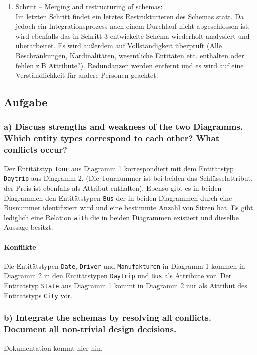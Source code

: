 \documentclass[11pt,a4paper,DIV=9]{scrartcl}
\newcounter{temp}
\newcommand{\aufgabe}[1]{
  \setcounter{temp}{\value{subsection}}
  \setcounter{subsection}{#1}
  \addtocounter{subsection}{-1}
  \subsection{Aufgabe}
  \setcounter{subsection}{\value{temp}}
}
\newcommand{\teil}[2][]{
  \subsubsection*{#2) #1}
}
\begin{document}
\begin{enumerate}
    \item Schritt -- Merging and restructuring of schemas: \\
    Im letzten Schritt findet ein letztes Restrukturieren des Schemas statt. Da jedoch ein Integrationsprozess nach einem Durchlauf nicht abgeschlossen ist, wird ebenfalls das in Schritt 3 entwickelte Schema wiederholt analysiert und \"uberarbeitet. Es wird au{\ss}erdem auf Vollst\"andigkeit \"uberpr\"uft (Alle Beschr\"ankungen, Kardinalit\"aten, wesentliche Entit\"aten etc. enthalten oder fehlen z.B Attribute?). Redundanzen werden entfernt und es wird auf eine Verst\"andlichkeit f\"ur andere Personen geachtet.
  \end{enumerate}

\aufgabe{3}
\teil[Discuss strengths and weakness of the two Diagramms. Which entity types correspond to each other? What conflicts occur?]{a}
  Der Entit\"atstyp \texttt{Tour} aus Diagramm 1 korrespondiert mit dem Entit\"atstyp \texttt{Daytrip} aus Diagramm 2. (Die Tournummer ist bei beiden das Schl\"usselattribut, der Preis ist ebenfalls als Attribut enthalten). Ebenso gibt es in beiden Diagrammen den Entit\"atstypen \texttt{Bus} der in beiden Diagrammen durch eine Busnummer identifiziert wird und eine bestimmte Anzahl von Sitzen hat. Es gibt lediglich eine Relation \texttt{with} die in beiden Diagrammen existiert und dieselbe Aussage besitzt.
  \paragraph{Konflikte} %
  \label{par:konflikte}
    Die Entit\"atstypen \texttt{Date}, \texttt{Driver} und \texttt{Manufakturen} in Diagramm 1 kommen in Diagramm 2 in den Entit\"atstypen \texttt{Daytrip} und \texttt{Bus} als Attribute vor. Der Entit\"atstyp \texttt{State} aus Diagramm 1 kommt in Diagramm 2 nur als Attribut des Entit\"atstyps \texttt{City} vor.

\teil[Integrate the schemas by resolving all conflicts. Document all non-trivial design decisions.]{b}
Dokumentation kommt hier hin.
\end{document}
